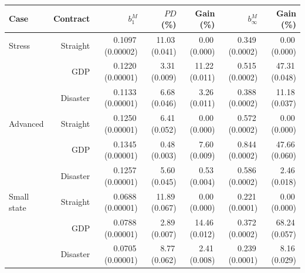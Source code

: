 \begin{tabular}{@{}lrrrrrr@{}}
\toprule
Case & Contract & $b_1^M$ & $PD$ (\%) & Gain (\%) & $b_\infty^M$ & Gain (\%) \\ \midrule
Stress & Straight & 0.1097\,(0.00002) & 11.03\,(0.041) & 0.00\,(0.000) & 0.349\,(0.0002) & 0.00\,(0.000) \\
 & GDP & 0.1220\,(0.00001) & 3.31\,(0.009) & 11.22\,(0.011) & 0.515\,(0.0002) & 47.31\,(0.048) \\
 & Disaster & 0.1133\,(0.00001) & 6.68\,(0.046) & 3.26\,(0.011) & 0.388\,(0.0002) & 11.18\,(0.037) \\
Advanced & Straight & 0.1250\,(0.00001) & 6.41\,(0.052) & 0.00\,(0.000) & 0.572\,(0.0002) & 0.00\,(0.000) \\
 & GDP & 0.1345\,(0.00001) & 0.48\,(0.003) & 7.60\,(0.009) & 0.844\,(0.0002) & 47.66\,(0.060) \\
 & Disaster & 0.1257\,(0.00001) & 5.60\,(0.045) & 0.53\,(0.004) & 0.586\,(0.0002) & 2.46\,(0.018) \\
Small state & Straight & 0.0688\,(0.00001) & 11.89\,(0.067) & 0.00\,(0.000) & 0.221\,(0.0001) & 0.00\,(0.000) \\
 & GDP & 0.0788\,(0.00001) & 2.89\,(0.007) & 14.46\,(0.012) & 0.372\,(0.0002) & 68.24\,(0.057) \\
 & Disaster & 0.0705\,(0.00001) & 8.77\,(0.062) & 2.41\,(0.008) & 0.239\,(0.0001) & 8.16\,(0.029) \\
\bottomrule
\end{tabular}
